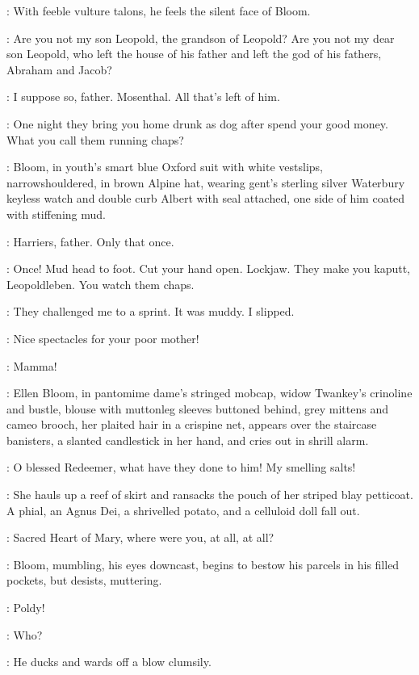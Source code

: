 :
With feeble vulture talons,
he feels the silent face of Bloom.

\Rudolph:
Are you not my son Leopold,
the grandson of Leopold?
Are you not my dear son Leopold,
who left the house of his father
and left the god of his fathers,
Abraham and Jacob?

\Bloom:
I suppose so,
father.
Mosenthal.
All that's left of him.

\Rudolph:
One night they bring you home drunk as dog after spend your good money.
What you call them running chaps?

:
Bloom,
in youth's smart blue Oxford suit with white vestslips,
narrowshouldered,
in brown Alpine hat,
wearing gent's sterling silver Waterbury keyless watch
and double curb Albert with seal attached,
one side of him coated with stiffening mud.

\Bloom:
Harriers,
father.
Only that once.

\Rudolph:
Once!
Mud head to foot.
Cut your hand open.
Lockjaw.
They make you kaputt,
Leopoldleben.
You watch them chaps.

\Bloom:
They challenged me to a sprint.
It was muddy.
I slipped.

\Rudolph:
Nice spectacles for your poor mother!

\Bloom:
Mamma!

:
Ellen Bloom,
in pantomime dame's stringed mobcap,
widow Twankey's crinoline and bustle,
blouse with muttonleg sleeves buttoned behind,
grey mittens and cameo brooch,
her plaited hair in a crispine net,
appears over the staircase banisters,
a slanted candlestick in her hand,
and cries out in shrill alarm.

\Ellen:
O blessed Redeemer,
what have they done to him!
My smelling salts!

:
She hauls up a reef of skirt and ransacks the
pouch of her striped blay petticoat.
A phial,
an Agnus Dei,
a shrivelled potato,
and a celluloid doll fall out.

\Ellen:
Sacred Heart of Mary,
where were you,
at all,
at all?

:
Bloom,
mumbling,
his eyes downcast,
begins to bestow his parcels in his filled pockets,
but desists,
muttering.

\Marion:
 Poldy!

\Bloom:
Who?

:
He ducks and wards off a blow clumsily.

